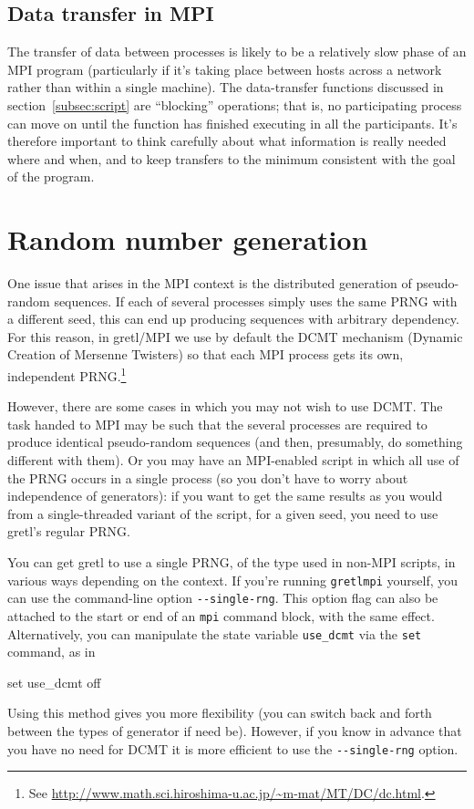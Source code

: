 \documentclass{article}
\begin{document}
\subsection{Data transfer in MPI}
\label{sec:data-transfer}

The transfer of data between processes is likely to be a relatively slow
phase of an MPI program (particularly if it's taking place between
hosts across a network rather than within a single machine). The
data-transfer functions discussed in section~\ref{subsec:script} are
``blocking'' operations; that is, no participating process can move on
until the function has finished executing in all the participants.
It's therefore important to think carefully about what information is
really needed where and when, and to keep transfers to the minimum
consistent with the goal of the program.


\section{Random number generation}
\label{sec:random}

One issue that arises in the MPI context is the distributed generation
of pseudo-random sequences. If each of several processes simply uses
the same PRNG with a different seed, this can end up producing
sequences with arbitrary dependency. For this reason, in gretl/MPI we
use by default the \textsf{DCMT} mechanism (Dynamic Creation of
Mersenne Twisters) so that each MPI process gets its own, independent
PRNG.\footnote{See
  \url{http://www.math.sci.hiroshima-u.ac.jp/~m-mat/MT/DC/dc.html}.}

However, there are some cases in which you may not wish to use
\textsf{DCMT}. The task handed to MPI may be such that the several
processes are required to produce identical pseudo-random sequences
(and then, presumably, do something different with them). Or you may
have an MPI-enabled script in which all use of the PRNG occurs in a
single process (so you don't have to worry about independence of
generators): if you want to get the same results as you would from a
single-threaded variant of the script, for a given seed, you need to
use gretl's regular PRNG.

You can get gretl to use a single PRNG, of the type used in non-MPI
scripts, in various ways depending on the context. If you're running
\texttt{gretlmpi} yourself, you can use the command-line option
\verb|--single-rng|. This option flag can also be attached to the
start or end of an \texttt{mpi} command block, with the same effect.
Alternatively, you can manipulate the state variable \verb|use_dcmt|
via the \texttt{set} command, as in
\begin{code}
set use_dcmt off
\end{code}
Using this method gives you more flexibility (you can switch back and
forth between the types of generator if need be). However, if you know
in advance that you have no need for \textsf{DCMT} it is more
efficient to use the \verb|--single-rng| option.
\end{document}
